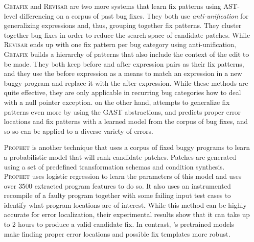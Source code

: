 \textsc{Getafix} \citep{Bader_2019} and
\textsc{Revisar} \citep{Rolim_2018} are
two more systems that learn fix patterns
using AST-level differencing on a corpus
of past bug fixes.
%
They both use \emph{anti-unification}
\citep{Kutsia_2014} for generalizing
expressions and, thus, grouping together
fix patterns.
%
They cluster together bug fixes in order
to reduce the search space of candidate
patches.
%
While \textsc{Revisar} \citep{Rolim_2018}
ends up with one fix pattern per bug category
using anti-unification, \textsc{Getafix}
\citep{Bader_2019} builds a hierarchy of
patterns that also include the context
of the edit to be made.
%
They both keep before and after expression pairs as
their fix patterns, and they use the before expression
as a means to match an expression in a new buggy program
and replace it with the after expression.
%
While these methods are quite effective,
they are only applicable in recurring
bug categories \eg how to deal with a
null pointer exception.
%
\toolname on the other hand, attempts
to generalize fix patterns even more by
using the GAST abstractions, and predicts
proper error locations and fix patterns
with a learned model from the corpus of
bug fixes, and so so can be applied to a
diverse variety of errors.

\textsc{Prophet} \citep{Long_2016} is another technique that uses a corpus of
fixed buggy programs to learn a probabilistic model that will rank candidate
patches. Patches are generated using a set of predefined transformation schemas
and condition synthesis. \textsc{Prophet} uses logistic regression to learn the
parameters of this model and uses over 3500 extracted program features to do so.
It also uses an instrumented recompile of a faulty program together with some
failing input test cases to identify what program locations are of interest.
While this method can be highly accurate for error localization, their
experimental results show that it can take up to 2 hours to produce a valid
candidate fix. In contrast, \toolname's pretrained models make finding proper
error locations and possible fix templates more robust.
